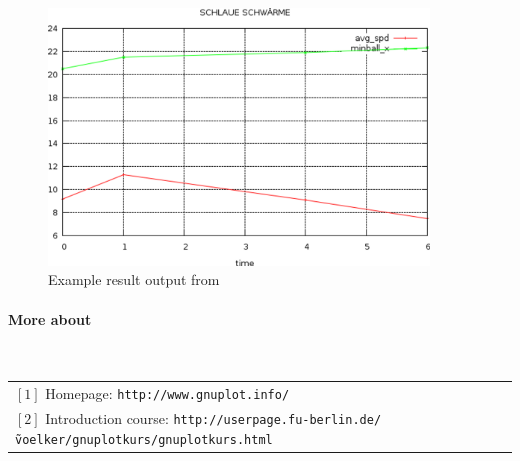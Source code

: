 \begin{figure}
	\includegraphics[width=0.9\textwidth]{stats-howto-gnuplot.png}
	\caption{Example result output from \gnuplot}
\end{figure}


\paragraph{More about \gnuplot}~\\

\begin{tabular}{l}
 $[1]$ Homepage: \texttt{\scriptsize http://www.gnuplot.info/} \\
 $[2]$ Introduction course: \texttt{\scriptsize http://userpage.fu-berlin.de/\~voelker/gnuplotkurs/gnuplotkurs.html}
\end{tabular}